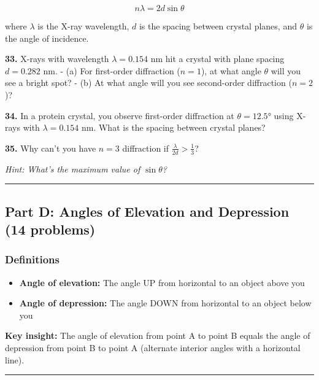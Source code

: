 \documentclass[
  11pt,
]{article}
\providecommand{\tightlist}{%
  \setlength{\itemsep}{0pt}\setlength{\parskip}{0pt}}
\begin{document}
\[n\lambda = 2d\sin\theta\]

where \(\lambda\) is the X-ray wavelength, \(d\) is the spacing between
crystal planes, and \(\theta\) is the angle of incidence.

\textbf{33.} X-rays with wavelength \(\lambda = 0.154\) nm hit a crystal
with plane spacing \(d = 0.282\) nm. - (a) For first-order diffraction
(\(n = 1\)), at what angle \(\theta\) will you see a bright spot? - (b)
At what angle will you see second-order diffraction (\(n = 2\))?

\textbf{34.} In a protein crystal, you observe first-order diffraction
at \(\theta = 12.5°\) using X-rays with \(\lambda = 0.154\) nm. What is
the spacing between crystal planes?

\textbf{35.} Why can't you have \(n = 3\) diffraction if
\(\frac{\lambda}{2d} > \frac{1}{3}\)?

\emph{Hint: What's the maximum value of \(\sin\theta\)?}

\begin{center}\rule{0.5\linewidth}{0.5pt}\end{center}

\hypertarget{part-d-angles-of-elevation-and-depression-14-problems}{%
\subsection{Part D: Angles of Elevation and Depression (14
problems)}\label{part-d-angles-of-elevation-and-depression-14-problems}}

\hypertarget{definitions}{%
\subsubsection{Definitions}\label{definitions}}

\begin{itemize}
\tightlist
\item
  \textbf{Angle of elevation:} The angle UP from horizontal to an object
  above you
\item
  \textbf{Angle of depression:} The angle DOWN from horizontal to an
  object below you
\end{itemize}

\textbf{Key insight:} The angle of elevation from point A to point B
equals the angle of depression from point B to point A (alternate
interior angles with a horizontal line).

\begin{center}\rule{0.5\linewidth}{0.5pt}\end{center}
\end{document}

